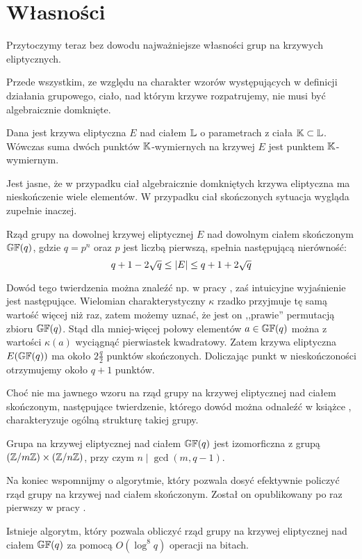 \section{Własności}

\noindent
Przytoczymy teraz bez dowodu najważniejsze własności
grup na krzywych eliptycznych.

\noindent
Przede wszystkim, ze względu na charakter wzorów występujących
w definicji działania grupowego,
ciało, nad którym krzywe rozpatrujemy, nie musi być algebraicznie domknięte.

\begin{fact}
Dana jest krzywa eliptyczna $E$ nad ciałem $\mathbb{L}$
o parametrach z ciała $\mathbb{K} \subset \mathbb{L}$.
Wówczas suma dwóch punktów $\mathbb{K}$-wymiernych na krzywej $E$
jest punktem $\mathbb{K}$-wymiernym.
\end{fact}

\noindent
Jest jasne, że w przypadku ciał algebraicznie domkniętych krzywa eliptyczna
ma nieskończenie wiele elementów.
W przypadku ciał skończonych sytuacja wygląda zupełnie inaczej.

\begin{theorem}[Hasse]
Rząd grupy na dowolnej krzywej eliptycznej $E$
nad dowolnym ciałem skończonym $\mathbb{GF}(q)$,
gdzie $q = p^n$ oraz $p$ jest liczbą pierwszą,
spełnia następującą nierówność:
\begin{equation}
q + 1 - 2\sqrt{q} \leq \lvert E\rvert \leq q + 1 + 2\sqrt{q}
\end{equation}
\end{theorem}

\noindent
Dowód tego twierdzenia można znaleźć np. w pracy \cite{ecintro1},
zaś intuicyjne wyjaśnienie jest następujące.
Wielomian charakterystyczny $\kappa$ rzadko przyjmuje tę samą wartość
więcej niż raz, zatem możemy uznać, że jest on ,,prawie''
permutacją zbioru $\mathbb{GF}(q)$.
Stąd dla mniej-więcej połowy elementów $a \in \mathbb{GF}(q)$
można z wartości $\kappa(a)$ wyciągnąć pierwiastek kwadratowy.
Zatem krzywa eliptyczna $E(\mathbb{GF}(q))$ ma około $2\frac{q}{2}$ punktów skończonych.
Doliczając punkt w nieskończoności otrzymujemy około $q + 1$ punktów.

\noindent
Choć nie ma jawnego wzoru
na rząd grupy na krzywej eliptycznej nad ciałem skończonym,
następujące twierdzenie,
którego dowód można odnaleźć w książce \cite{silverman},
charakteryzuje ogólną strukturę takiej grupy.

\begin{theorem}\label{finite_curve_structure_theorem}
Grupa na krzywej eliptycznej nad ciałem $\mathbb{GF}(q)$
jest izomorficzna z grupą $(\mathbb{Z}/m\mathbb{Z}) \times (\mathbb{Z}/n\mathbb{Z})$,
przy czym $n \mid \gcd(m, q-1)$.
\end{theorem}

\noindent
Na koniec wspomnijmy o algorytmie,
który pozwala dosyć efektywnie policzyć
rząd grupy na krzywej nad ciałem skończonym.
Został on opublikowany po raz pierwszy w pracy \cite{schoof}.

\begin{theorem}[Schoof]
Istnieje algorytm, który pozwala obliczyć rząd grupy na krzywej eliptycznej
nad ciałem $\mathbb{GF}(q)$ za pomocą $O(\log^8 q)$ operacji na bitach.
\end{theorem}

